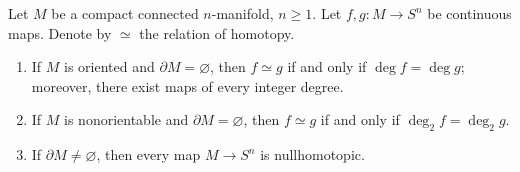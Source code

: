 Let $M$ be a compact connected $n$-manifold, $n \geqslant 1$. Let $f, g \colon M \to S^{n}$ be continuous maps. Denote by $\simeq$ the relation of homotopy.

\begin{enumerate}
\item[(a)] If $M$ is oriented and $\partial M = \varnothing$, then $f \simeq g$ if and only if $\deg f = \deg g$; moreover, there exist maps of every integer degree.
\item[(b)] If $M$ is nonorientable and $\partial M = \varnothing$, then $f \simeq g$ if and only if $\deg_2 f = \deg_2 g$.
\item[(c)] If $\partial M \neq \varnothing$, then every map $M \to S^{n}$ is nullhomotopic.
\end{enumerate}
